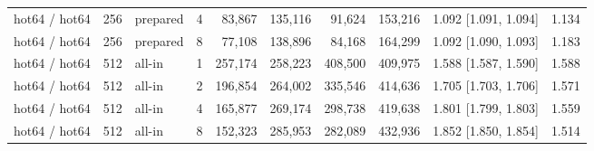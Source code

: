\begin{table}[t]
{\begin{tabular}{lrlrrrrrlr}
hot64 / hot64 & 256 & prepared & 4 & 83{,}867 & 135{,}116 & 91{,}624 & 153{,}216 & 1.092 [1.091, 1.094] & 1.134 \\
hot64 / hot64 & 256 & prepared & 8 & 77{,}108 & 138{,}896 & 84{,}168 & 164{,}299 & 1.092 [1.090, 1.093] & 1.183 \\
hot64 / hot64 & 512 & all-in & 1 & 257{,}174 & 258{,}223 & 408{,}500 & 409{,}975 & 1.588 [1.587, 1.590] & 1.588 \\
hot64 / hot64 & 512 & all-in & 2 & 196{,}854 & 264{,}002 & 335{,}546 & 414{,}636 & 1.705 [1.703, 1.706] & 1.571 \\
hot64 / hot64 & 512 & all-in & 4 & 165{,}877 & 269{,}174 & 298{,}738 & 419{,}638 & 1.801 [1.799, 1.803] & 1.559 \\
hot64 / hot64 & 512 & all-in & 8 & 152{,}323 & 285{,}953 & 282{,}089 & 432{,}936 & 1.852 [1.850, 1.854] & 1.514 \\
\bottomrule
\end{tabular}}
\end{table}

